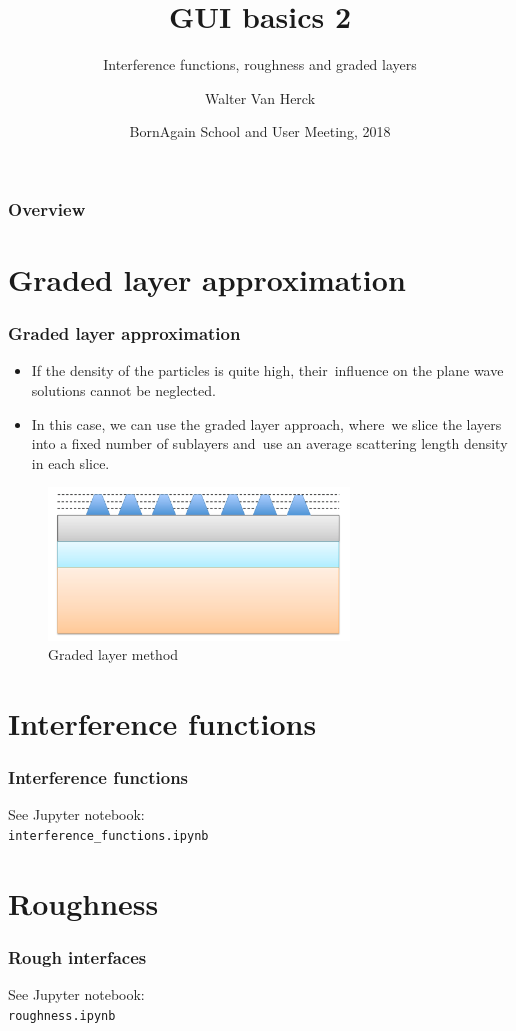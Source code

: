 \documentclass{beamer}
\title{GUI basics 2}
\subtitle{Interference functions, roughness and graded layers}
\author
{Walter Van Herck\inst{1}}
\institute[JCNS at MLZ] %
{
  \inst{1}%
  J\"ulich Centre for Neutron Science at MLZ
}
\date[BornAgain] %
{BornAgain School and User Meeting, 2018}
\begin{document}
\frame[plain]{\titlepage}

\begin{frame}
    \frametitle{Overview}
    \tableofcontents
\end{frame}

\section{Graded layer approximation}

\begin{frame}
    \frametitle{Graded layer approximation}
    \begin{itemize}
        \item If the density of the particles is quite high, their\
                influence on the plane wave solutions cannot be neglected.
        \item In this case, we can use the graded layer approach, where\
                we slice the layers into a fixed number of sublayers and\
                use an average scattering length density in each slice.
    \end{itemize}
    \begin{figure}
        \includegraphics[width=8cm]{graded_layer.png}
        \\ Graded layer method
    \end{figure}
\end{frame}

\section{Interference functions}

\begin{frame}[fragile]
    \frametitle{Interference functions}
    \begin{center}
        See Jupyter notebook:\\
        \verb+interference_functions.ipynb+
    \end{center}
\end{frame}

\section{Roughness}

\begin{frame}[fragile]
    \frametitle{Rough interfaces}
    \begin{center}
        See Jupyter notebook:\\
        \verb+roughness.ipynb+
    \end{center}
\end{frame}
\end{document}
